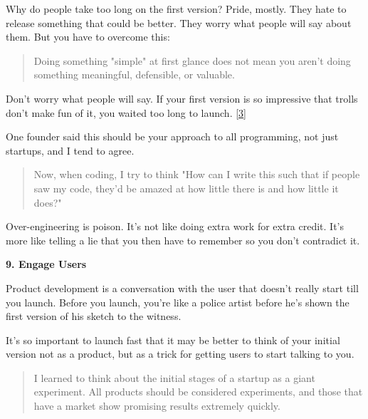                   Why do people take too long on the first version? Pride,
                  mostly. They hate to release something that could be better.
                  They worry what people will say about them. But you have to
                  overcome this:
                  \begin{quote}

                    Doing something "simple" at first glance does not mean you
                    aren't doing something meaningful, defensible, or valuable.
                  
\end{quote}

                  Don't worry what people will say. If your first version is so
                  impressive that trolls don't make fun of it, you waited too
                  long to launch.
                  [\href{\#f3n}{3}]

One founder said this should be your approach to
                  all programming, not just startups, and I tend to agree.
                  \begin{quote}

                    Now, when coding, I try to think "How can I write this such
                    that if people saw my code, they'd be amazed at how little
                    there is and how little it does?"
                  
\end{quote}

                  Over-engineering is poison. It's not like doing extra work for
                  extra credit. It's more like telling a lie that you then have
                  to remember so you don't contradict it.


                  \textbf{9. Engage Users}

Product development is a
                  conversation with the user that doesn't really start till you
                  launch. Before you launch, you're like a police artist before
                  he's shown the first version of his sketch to the witness.

It's
                  so important to launch fast that it may be better to think of
                  your initial version not as a product, but as a trick for
                  getting users to start talking to you.
                  \begin{quote}

                    I learned to think about the initial stages of a startup as
                    a giant experiment. All products should be considered
                    experiments, and those that have a market show promising
                    results extremely quickly.
                  
\end{quote}

